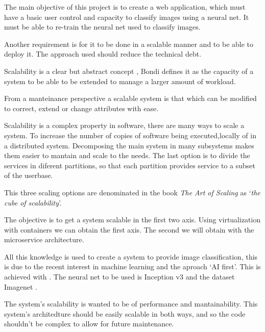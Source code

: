 The main objective of this project is to create a web application, which must have a basic user control and capacity to classify images using a neural net. It must be able to re-train the neural net used to classify images.

Another requirement is for it to be done in a scalable manner and to be able to deploy it. The approach used should reduce the technical debt.

Scalability is a clear but abstract concept \cite{hill90}, Bondi \cite{bondi00} defines it as the capacity of a system to be able to be extended to manage a larger amount of workload. 

From a manteinance perspective a scalable system is that which can be modified to correct, extend or change attributes with ease.

Scalability is a complex property in software, there are many ways to scale a system. To increase the number of copies of software being executed,locally of in a distributed system. Decomposing the main system in many subsystems makes them easier to mantain and scale to the needs. The last option is to divide the services in diferent partitions, so that each partition provides service to a subset of the userbase.

This three scaling options are denominated in the book \emph{The Art of Scaling} \cite{scala09} as `\emph{the cube of scalability}'. 

The objective is to get a system scalable in the first two axis. Using virtualization with containers we can obtain the first axis. The second we will obtain with the microservice architecture. 

All this knowledge is used to create a system to provide image classification, this is due to the recent interest in machine learning and the aproach `AI first'. This is achieved with  \cite{tf}. The neural net to be used is Inception v3 \cite{incep} and the dataset Imagenet \cite{imnet}.

The system's scalability is wanted to be of performance and mantainability. This system's architedture should be easily scalable in both ways, and so the code shouldn't be complex to allow for future maintenance. 